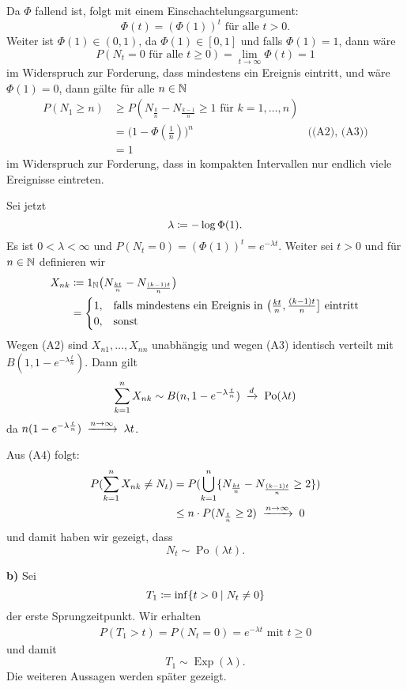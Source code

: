 \documentclass[a4paper,twoside,DIV15,BCOR12mm]{scrbook}
\begin{document}
\begin{beweis}
Da $\Phi$ fallend ist, folgt mit einem Einschachtelungsargument: 
\[
\Phi(t) = (\Phi(1))^t\text{ für alle } t >0.
\]
Weiter ist $\Phi(1) \in (0,1)$, da $\Phi(1) \in[0,1]$ und falls $\Phi(1)=1$, dann wäre 
\[
P(N_t = 0 \text{ für alle } t\ge 0)= \lim_{t\to\infty} \Phi(t) = 1
\]
im Widerspruch zur Forderung, dass mindestens ein Ereignis eintritt, und wäre $\Phi(1) = 0$, dann gälte für alle $n\in \mathbb{N}$
\begin{align*}
P(N_1\ge n) 
&\ge P(N_{\frac kn} - N_{\frac {k-1}n} \ge 1 \text{ für } k =1,\ldots,n)\\
&= \Big(1-\Phi(\frac 1n)\Big) ^n &\text{((A2), (A3))} \\
&= 1
\end{align*}
im Widerspruch zur Forderung, dass in kompakten Intervallen nur endlich viele Ereignisse eintreten.

Sei jetzt 
\[
\lambda \da - \log \Phi(1).
\]
Es ist $0<\lambda <\infty$ und $P(N_t=0)= (\Phi(1))^t = e^{-\lambda t}$. Weiter sei $t>0$ und für $n\in \mathbb{N}$ definieren wir
\begin{align*}
X_{nk} &\da 1_{\MdN}\big(N_{\frac{kt}n} - N_{\frac{(k-1)t}n}\big)\\
&= 
\begin{cases}
1, &\text{falls mindestens ein Ereignis in $\big(\frac{kt}n, \frac{(k-1)t}n\big]$ eintritt}\\
0, &\text{sonst}
\end{cases}
\end{align*}
Wegen (A2) sind $X_{n1},\ldots,X_{nn}$ unabhängig und wegen (A3) identisch verteilt mit $B(1,1-e^{-\lambda \frac tn})$. Dann gilt
\begin{align*}
\sum_{k=1}^n X_{nk} \sim B(n,1-e^{-\lambda \frac tn}) \tomit d \operatorname{Po}(\lambda t)
\end{align*}
da $n(1-e^{-\lambda \frac tn}) \tomit{n\to \infty} \lambda t$.

Aus (A4) folgt:
\begin{align*}
P(\sum_{k=1}^n X_{nk} \ne N_t) 
&= P(\bigcup_{k=1}^n\{N_{\frac {kt}n} - N_{ \frac{(k-1)t}n} \ge 2\})\\
&\le n \cdot P(N_{\frac tn} \ge 2) \tomit {n\to \infty} 0
\end{align*}
und damit haben wir gezeigt, dass
\[
N_t \sim \operatorname{Po}(\lambda t).
\]

\textbf{b)} Sei
\[
T_1 \da \inf \{t>0\mid N_t \ne 0\}
\]
der erste Sprungzeitpunkt. Wir erhalten
\begin{align*}
P(T_1 > t) = P(N_t = 0) = e^{-\lambda t}\text{ mit } t \ge 0
\end{align*} und damit
\[
T_1 \sim \operatorname{Exp}(\lambda).
\]
Die weiteren Aussagen werden später gezeigt.
\end{beweis}
\end{document}
